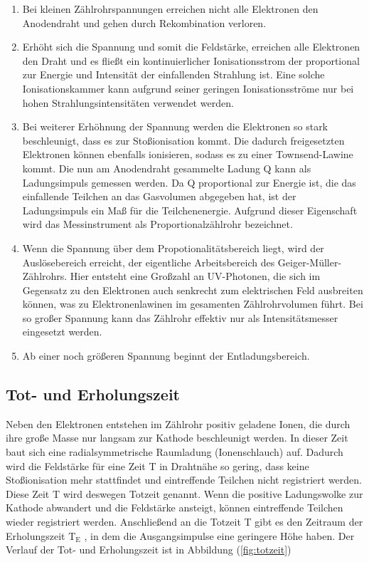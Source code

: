 \begin{enumerate}
\item Bei kleinen Zählrohrspannungen erreichen nicht alle Elektronen den Anodendraht und gehen durch Rekombination verloren.

\item Erhöht sich die Spannung und somit die Feldstärke, 
erreichen alle Elektronen den Draht und es fließt ein kontinuierlicher Ionisationsstrom der proportional zur Energie und Intensität der einfallenden Strahlung ist.
Eine solche Ionisationskammer kann aufgrund seiner geringen Ionisationsströme nur bei hohen Strahlungsintensitäten verwendet werden.

\item Bei weiterer Erhöhnung der Spannung werden die Elektronen so stark beschleunigt, dass es zur Stoßionisation kommt.
Die dadurch freigesetzten Elektronen können ebenfalls ionisieren, sodass es zu einer Townsend-Lawine kommt.
Die nun am Anodendraht gesammelte Ladung Q kann als Ladungsimpuls gemessen werden.
Da Q proportional zur Energie ist, die das einfallende Teilchen an das Gasvolumen abgegeben hat, 
ist der Ladungsimpuls ein Maß für die Teilchenenergie.
Aufgrund dieser Eigenschaft wird das Messinstrument als Proportionalzählrohr bezeichnet.

\item Wenn die Spannung über dem Propotionalitätsbereich liegt, wird der Auslösebereich erreicht, 
der eigentliche Arbeitsbereich des Geiger-Müller-Zählrohrs. 
Hier entsteht eine Großzahl an UV-Photonen, die sich im Gegensatz zu den Elektronen auch senkrecht zum elektrischen Feld ausbreiten können,
was zu Elektronenlawinen im gesamenten Zählrohrvolumen führt.
Bei so großer Spannung kann das Zählrohr effektiv nur als Intensitätsmesser eingesetzt werden. 

\item Ab einer noch größeren Spannung beginnt der Entladungsbereich.

\end{enumerate}

\subsection{Tot- und Erholungszeit}
Neben den Elektronen entstehen im Zählrohr positiv geladene Ionen, die durch ihre große Masse nur langsam zur Kathode beschleunigt werden.
In dieser Zeit baut sich eine radialsymmetrische Raumladung (Ionenschlauch) auf.
Dadurch wird die Feldstärke für eine Zeit T in Drahtnähe so gering, dass keine Stoßionisation mehr stattfindet und eintreffende Teilchen nicht registriert werden.
Diese Zeit T wird deswegen Totzeit genannt.
Wenn die positive Ladungswolke zur Kathode abwandert und die Feldstärke ansteigt, können eintreffende Teilchen wieder registriert werden.
Anschließend an die Totzeit T gibt es den Zeitraum der Erholungszeit $\text{T}_\text{E}$ , in dem die Ausgangsimpulse eine geringere Höhe haben.
Der Verlauf der Tot- und Erholungszeit ist in Abbildung (\ref{fig:totzeit})

